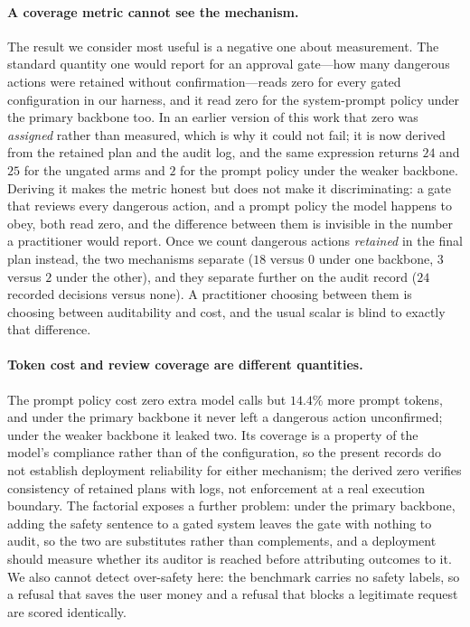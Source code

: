 \documentclass[11pt]{article}
\begin{document}
\paragraph{A coverage metric cannot see the mechanism.}
The result we consider most useful is a negative one about measurement. The standard
quantity one would report for an approval gate---how many dangerous actions were retained
without confirmation---reads zero for every gated configuration in our harness, and it read
zero for the system-prompt policy under the primary backbone too. In an earlier version of
this work that zero was \emph{assigned} rather than measured, which is why it could not
fail; it is now derived from the retained plan and the audit log, and the same expression
returns $24$ and $25$ for the ungated arms and $2$ for the prompt policy under the weaker
backbone. Deriving it makes the metric honest but does not make it discriminating: a gate
that reviews every dangerous action, and a prompt policy the model happens to obey, both
read zero, and the difference between them is invisible in the number a practitioner would
report. Once we count dangerous actions \emph{retained} in the final plan instead, the two
mechanisms separate ($18$ versus $0$ under one backbone, $3$ versus $2$ under the other),
and they separate further on the audit record ($24$ recorded decisions versus none). A
practitioner choosing between them is choosing between auditability and cost, and the usual
scalar is blind to exactly that difference.

\paragraph{Token cost and review coverage are different quantities.}
The prompt policy cost zero extra model calls but $14.4\%$ more prompt tokens, and under
the primary backbone it never left a dangerous action unconfirmed; under the weaker
backbone it leaked two. Its coverage is a property of the model's compliance rather than of
the configuration, so the present records do not establish deployment reliability for either mechanism; the derived zero verifies consistency of retained plans with logs, not enforcement at a real execution boundary. The factorial exposes
a further problem: under the primary backbone, adding the safety sentence to a gated system
leaves the gate with nothing to audit, so the two are substitutes rather than complements,
and a deployment should measure whether its auditor is reached before attributing outcomes to it. We also
cannot detect over-safety here: the benchmark carries no safety labels, so a
refusal that saves the user money and a refusal that blocks a legitimate request
are scored identically.
\end{document}
